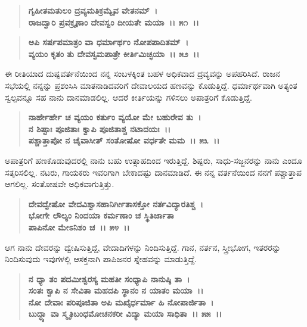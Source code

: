 \begin{verse}
\textbf{ಗೃಹೀತಮತುಲಂ ದ್ರವ್ಯಮತಿಕ್ರಮ್ಯೈವ ವೇತನಮ್~।}\\\textbf{ರಾಜದ್ವಾರಿ ಪ್ರವಕ್ರೄಣಾಂ ದೇವಸ್ವಂ ದೀಯತೇ ಮಯಾ~।। ೫೧~।। }
\end{verse}

\begin{verse}
\textbf{ಅಪಿ ಸರ್ಷಪಮಾತ್ರಂ ವಾ ಧರ್ಮಾರ್ಥಂ ನೋಪಪಾದಿತಮ್~।}\\\textbf{ವ್ಯಯಂ ಕೃತಂ ತು ದೇವಸ್ವಮಪಾತ್ರೇ ಕೀರ್ತಿಮಿಚ್ಛಯಾ~।। ೫೨~।।}
\end{verse}

ಈ ರೀತಿಯಾದ ದುಷ್ಟವರ್ತನೆಯಿಂದ ನನ್ನ ಸಂಬಳಕ್ಕಿಂತ ಬಹಳ ಅಧಿಕವಾದ ದ್ರವ್ಯವನ್ನು ಅಪಹರಿಸಿದೆ. ರಾಜನ ಸಭೆಯಲ್ಲಿ ನನ್ನನ್ನು ಪ್ರಶಂಸಿಸಿ ಮಾತನಾಡಿದವರಿಗೆ ದೇವಾಲಯದ ಹಣವನ್ನು ಕೊಡುತ್ತಿದ್ದೆ. ಧರ್ಮಾರ್ಥವಾಗಿ ಅತ್ಯಂತ ಸ್ವಲ್ಪವನ್ನೂ ಸಹ ನಾನು ದಾನಮಾಡಲಿಲ್ಲ. ಆದರೆ ಕೀರ್ತಿಯನ್ನು ಗಳಿಸಲು ಅಪಾತ್ರರಿಗೆ ಕೊಡುತ್ತಿದ್ದೆ.

\begin{verse}
\textbf{ನಾರ್ಹೇರ್ಹೇ ಚ ವ್ಯಯಂ ಕರ್ತುಂ ವ್ಯಯೋ ಮೇ ಬಹುರೇವ ತು~।}\\\textbf{ನ ಶಿಷ್ಟಾಃ ಪೂಜಿತಾಃ ಕ್ವಾಪಿ ಪೂಜಿತಾಶ್ಚ ನಟಾದಯಃ~।। }\\\textbf{ಪಶ್ಚಾತ್ತಾಪೋ ನ ಚೈವಾಸೀತ್ ಸಂತೋಷೋ ವರ್ಧತೇ ಮಮ~।। ೫೩~।।}
\end{verse}

ಅಪಾತ್ರರಿಗೆ ಹಣಕೊಡುವುದರಲ್ಲಿ ನಾನು ಬಹು ಉತ್ಸಾಹದಿಂದ ಇರುತ್ತಿದ್ದೆ. ಶಿಷ್ಟರು, ಸಾಧು-\-ಸಜ್ಜನರನ್ನು ನಾನು ಎಂದೂ ಸತ್ಕರಿಸಲಿಲ್ಲ. ನಟರು, ಗಾಯಕರು ಇವರಿಗಾಗಿ ಬೇಕಾದಷ್ಟು ದಾನಮಾಡಿದೆ. ಈ ನನ್ನ ವರ್ತನೆಯಿಂದ ನನಗೆ ಪಶ್ಚಾತ್ತಾಪ ಆಗಲಿಲ್ಲ. ಸಂತೋಷವೇ ಅಧಿಕವಾಗುತ್ತಿತ್ತು.

\begin{verse}
\textbf{ದೇವದ್ವೇಷೋ ವೇದವಿಶ್ವಾಸಹಾನಿರ್ಗೀತಾಸಕ್ತೋ ನರ್ತವಿದ್ಯಾರತಿಶ್ಚ~।}\\\textbf{ಭೋಗೇ ಲೌಲ್ಯಂ ನಿಂದಯಾ ಕರ್ಮಣಾಂ ಚ ಸ್ಥಿತಿರ್ಜಾತಾ} \\\textbf{ಪಾಪಿನೋ ಮೇಽನಿಶಂ ಚ~।। ೫೪~।।}
\end{verse}

ಆಗ ನಾನು ದೇವರನ್ನು ದ್ವೇಷಿಸುತ್ತಿದ್ದೆ, ವೇದಾದಿಗಳನ್ನು ನಿಂದಿಸುತ್ತಿದ್ದೆ. ಗಾನ, ನರ್ತನ, ಸ್ತ್ರೀಭೋಗ, ಇತರರನ್ನು ನಿಂದಿಸುವುದು ಇವುಗಳಲ್ಲಿ ಆಸಕ್ತನಾಗಿ ಪಾಪಿಜನರ ಸ್ನೇಹವನ್ನು ಮಾಡುತ್ತಿದ್ದೆ.

\begin{verse}
\textbf{ನ ಧ್ಯಾ ತಂ ಪದಮೀಶ್ವರಸ್ಯ ಮಹತೀ ಸಂಧ್ಯಾಪಿ ನಾನುಷ್ಠಿ ತಾ~।}\\\textbf{ಸಂತಃ ಕ್ವಾಪಿ ನ ಸೇವಿತಾ ಮಹದಪಿ ಸ್ಥಾನಂ ನ ಯಾತಂ ಮಯಾ~।। }\\\textbf{ನೋ ದೇವಾಃ ಪರಿಪೂಜಿತಾ ಅಪಿ ಮಖೈರ್ಧರ್ಮಾ ಹಿ ನೋಪಾರ್ಜಿತಾ~।}\\\textbf{ಬುದ್ಧ್ಯಾ ವಾ ಸ್ಮೃತಿಬಂಧಮೋಚನಕರೀ ವಿದ್ಯಾ ಮಯಾ ಸಾಧಿತಾ~।। ೫೫~।।}
\end{verse}

